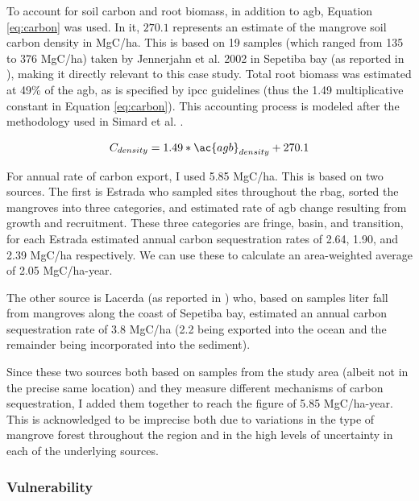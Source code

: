 To account for soil carbon and root biomass, in addition to \ac{agb}, Equation \ref{eq:carbon} was used. In it, $270.1$ represents an estimate of the mangrove soil carbon density in MgC/ha. This is based on 19 samples (which ranged from 135 to 376 MgC/ha) taken by Jennerjahn et al. 2002 \cite{jennerjahnRelevanceMangrovesProduction2002} in Sepetiba bay (as reported in \cite{kristensenOrganicCarbonDynamics2008, atwoodGlobalPatternsMangrove2017}), making it directly relevant to this case study.  Total root biomass was estimated at 49\% of the \ac{agb}, as is specified by \ac{ipcc} guidelines \cite{takahiko2013Supplement20062014} (thus the 1.49 multiplicative constant in Equation \ref{eq:carbon}). This accounting process is modeled after the methodology used in Simard et al. \cite{simardMangroveCanopyHeight2019}.

\begin{equation}
\label{eq:carbon}
C_{density} = 1.49 * \ac{agb}_{density} + 270.1 
\end{equation}

For annual rate of carbon export, I used 5.85 MgC/ha. This is based on two sources. The first is Estrada \cite{estrada2013analise} who sampled sites throughout the \ac{rbag}, sorted the mangroves into three categories, and estimated rate of \ac{agb} change resulting from growth and recruitment. These three categories are fringe, basin, and transition, for each Estrada estimated annual carbon sequestration rates of 2.64, 1.90, and 2.39 MgC/ha respectively. We can use these to calculate an area-weighted average of 2.05 MgC/ha-year. 

The other source is Lacerda \cite{lacerda1992carbon} (as reported in \cite{jennerjahnRelevanceMangrovesProduction2002}) who, based on samples liter fall from mangroves along the coast of Sepetiba bay, estimated an annual carbon sequestration rate of 3.8 MgC/ha (2.2 being exported into the ocean and the remainder being incorporated into the sediment).

Since these two sources both based on samples from the study area (albeit not in the precise same location) and they measure different mechanisms of carbon sequestration, I added them together to reach the figure of 5.85 MgC/ha-year. This is acknowledged to be imprecise both due to variations in the type of mangrove forest throughout the region and in the high levels of uncertainty in each of the underlying sources.

\subsubsection{Vulnerability} \label{sec:rio-vulnerability}

